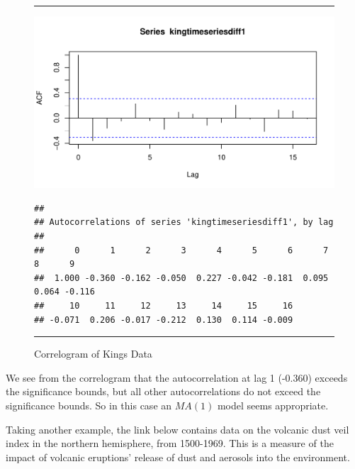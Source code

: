 \documentclass[11pt, letterpaper, twoside]{memoir}\usepackage{knitr}
\begin{document}
\begin{figure}
\centering
\rule{4in}{1pt}
\begin{knitrout}
\color{fgcolor}\begin{kframe}
\begin{alltt}
 
\end{alltt}
\end{kframe}
\includegraphics[width=\maxwidth]{figure/unnamed-chunk-121-1} 
\begin{kframe}\begin{alltt}
 \hlstd{=}\hlstd{)} 
\end{alltt}
\begin{verbatim}
## 
## Autocorrelations of series 'kingtimeseriesdiff1', by lag
## 
##      0      1      2      3      4      5      6      7      8      9 
##  1.000 -0.360 -0.162 -0.050  0.227 -0.042 -0.181  0.095  0.064 -0.116 
##     10     11     12     13     14     15     16 
## -0.071  0.206 -0.017 -0.212  0.130  0.114 -0.009
\end{verbatim}
\end{kframe}
\end{knitrout}
\caption{Correlogram of Kings Data}
\label{Fig:corking}
\rule{4in}{1pt}
\end{figure}

We see from the correlogram that the autocorrelation at lag 1 (-0.360) exceeds the significance bounds, but all other autocorrelations do not exceed the significance bounds. So in this case an $MA(1)$ model seems appropriate.

Taking another example, the link below contains data on the volcanic dust veil index in the northern hemisphere, from 1500-1969. This is a measure of the impact of volcanic eruptions' release of dust and aerosols into the environment. 
\end{document}
